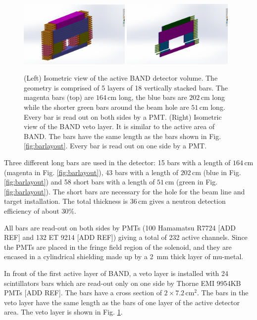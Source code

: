 \documentclass[review]{elsarticle}
\begin{document}
\begin{itemize}
\begin{figure}[htb]
\centering
\includegraphics[width=0.48\textwidth]{Band01.png}
  \includegraphics[width=0.48\textwidth]{BandVeto.png}
 \caption {(Left) Isometric view of the active BAND detector volume. The geometry is comprised of 5 layers of 18 vertically stacked bars. The magenta bars (top) are $164\,\mathrm{cm}$ long, the blue bars are $202\,\mathrm{cm}$ long while the shorter green bars around the beam hole are $51\,\mathrm{cm}$ long. Every bar is read out on both sides by a PMT. (Right) Isometric view of the BAND veto layer. It is similar to the active area of BAND. The bars have the same length as the bars shown in Fig. \ref{fig:barlayout}. Every bar is read out on one side by a PMT.}
  \label{fig:vetolayout}
\end{figure}
Three different long bars are used in the detector: 15 bars with a length of $164\,\mathrm{cm}$ (magenta in Fig. \ref{fig:barlayout}), 43 bars with a length of $202\,\mathrm{cm}$ (blue in Fig. \ref{fig:barlayout}) and 58 short bars with a length of $51\,\mathrm{cm}$ (green in Fig. \ref{fig:barlayout}). The short bars are necessary for the hole for the beam line and target installation. The total thickness is $36\,\mathrm{cm}$ gives a neutron detection efficiency of about 30\%.

All bars are read-out on both sides by PMTs (100 Hamamatsu R7724  [ADD REF] and 132 ET 9214  [ADD REF]) giving a total of 232 active channels. Since the PMTs are placed in the fringe field region of the solenoid, and they are encased in a cylindrical shielding made up by a \SI{2}{\milli\metre} thick layer of mu-metal.

In front of the first active layer of BAND, a veto layer is installed with 24 scintillators bars which are read-out only on one side by Thorne EMI 9954KB PMTs [ADD REF]. The bars have a cross section of $2 \times 7.2\,\mathrm{cm}^{2}$. The bars in the veto layer have the same length as the bars of one layer of the active detector area. The veto layer is shown in Fig. \ref{fig:vetolayout}.



\end{itemize}
\end{document}
